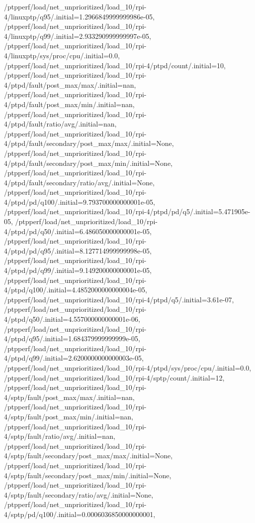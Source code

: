 {    /ptpperf/load/net_unprioritized/load_10/rpi-4/linuxptp/q95/.initial=1.2966849999999986e-05,
    /ptpperf/load/net_unprioritized/load_10/rpi-4/linuxptp/q99/.initial=2.933290999999997e-05,
    /ptpperf/load/net_unprioritized/load_10/rpi-4/linuxptp/sys/proc/cpu/.initial=0.0,
    /ptpperf/load/net_unprioritized/load_10/rpi-4/ptpd/count/.initial=10,
    /ptpperf/load/net_unprioritized/load_10/rpi-4/ptpd/fault/post_max/max/.initial=nan,
    /ptpperf/load/net_unprioritized/load_10/rpi-4/ptpd/fault/post_max/min/.initial=nan,
    /ptpperf/load/net_unprioritized/load_10/rpi-4/ptpd/fault/ratio/avg/.initial=nan,
    /ptpperf/load/net_unprioritized/load_10/rpi-4/ptpd/fault/secondary/post_max/max/.initial=None,
    /ptpperf/load/net_unprioritized/load_10/rpi-4/ptpd/fault/secondary/post_max/min/.initial=None,
    /ptpperf/load/net_unprioritized/load_10/rpi-4/ptpd/fault/secondary/ratio/avg/.initial=None,
    /ptpperf/load/net_unprioritized/load_10/rpi-4/ptpd/pd/q100/.initial=9.793700000000001e-05,
    /ptpperf/load/net_unprioritized/load_10/rpi-4/ptpd/pd/q5/.initial=5.471905e-05,
    /ptpperf/load/net_unprioritized/load_10/rpi-4/ptpd/pd/q50/.initial=6.486050000000001e-05,
    /ptpperf/load/net_unprioritized/load_10/rpi-4/ptpd/pd/q95/.initial=8.127714999999998e-05,
    /ptpperf/load/net_unprioritized/load_10/rpi-4/ptpd/pd/q99/.initial=9.149200000000001e-05,
    /ptpperf/load/net_unprioritized/load_10/rpi-4/ptpd/q100/.initial=4.4852000000000004e-05,
    /ptpperf/load/net_unprioritized/load_10/rpi-4/ptpd/q5/.initial=3.61e-07,
    /ptpperf/load/net_unprioritized/load_10/rpi-4/ptpd/q50/.initial=4.557000000000001e-06,
    /ptpperf/load/net_unprioritized/load_10/rpi-4/ptpd/q95/.initial=1.684379999999999e-05,
    /ptpperf/load/net_unprioritized/load_10/rpi-4/ptpd/q99/.initial=2.6200000000000003e-05,
    /ptpperf/load/net_unprioritized/load_10/rpi-4/ptpd/sys/proc/cpu/.initial=0.0,
    /ptpperf/load/net_unprioritized/load_10/rpi-4/sptp/count/.initial=12,
    /ptpperf/load/net_unprioritized/load_10/rpi-4/sptp/fault/post_max/max/.initial=nan,
    /ptpperf/load/net_unprioritized/load_10/rpi-4/sptp/fault/post_max/min/.initial=nan,
    /ptpperf/load/net_unprioritized/load_10/rpi-4/sptp/fault/ratio/avg/.initial=nan,
    /ptpperf/load/net_unprioritized/load_10/rpi-4/sptp/fault/secondary/post_max/max/.initial=None,
    /ptpperf/load/net_unprioritized/load_10/rpi-4/sptp/fault/secondary/post_max/min/.initial=None,
    /ptpperf/load/net_unprioritized/load_10/rpi-4/sptp/fault/secondary/ratio/avg/.initial=None,
    /ptpperf/load/net_unprioritized/load_10/rpi-4/sptp/pd/q100/.initial=0.0006036850000000001,
}
